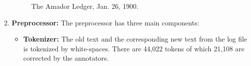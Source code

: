 \documentclass[10pt, conference, compsocconf]{IEEEtran}
\begin{document}
\begin{enumerate}
\begin{figure}[ht]
\begin{center}
\caption{The Amador Ledger, Jan. 26, 1900.}
\label{News_01}
\end{center}
\end{figure}

\item \textbf{Preprocessor: } The preprocessor has three main components:
\begin{itemize}
\item \textbf{Tokenizer: } The old text and the corresponding new text from the log file is tokenized by white-spaces. There are 44,022 tokens of which 21,108 are corrected by the annotators.


\end{itemize}
\end{enumerate}
\end{document}
